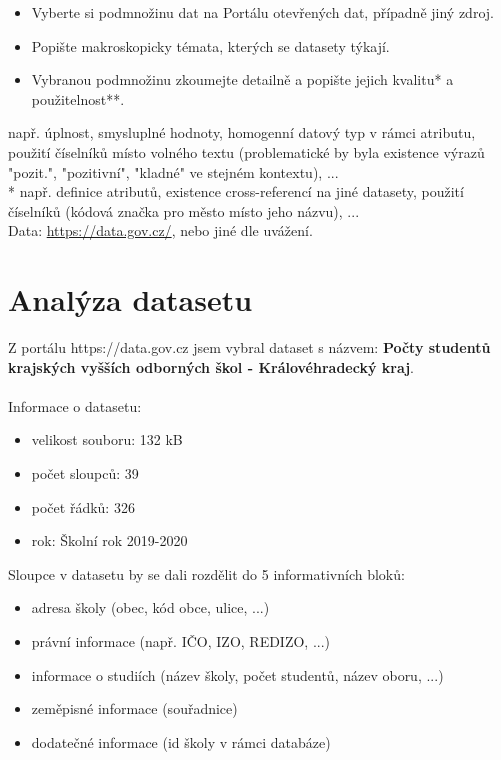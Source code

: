 \documentclass[12pt, a4paper]{article}
\begin{document}
\begin{itemize}
\item Vyberte si podmnožinu dat na Portálu otevřených dat, případně jiný zdroj. \\
\item Popište makroskopicky témata, kterých se datasety týkají.\\
\item Vybranou podmnožinu zkoumejte detailně a popište jejich kvalitu* a použitelnost**.\\
\end{itemize}

\noindent * např. úplnost, smysluplné hodnoty, homogenní datový typ v rámci atributu, použití číselníků místo volného textu (problematické by byla existence výrazů "pozit.", "pozitivní", "kladné" ve stejném kontextu), ...\\

\noindent ** např. definice atributů, existence cross-referencí na jiné datasety, použití číselníků (kódová značka pro město místo jeho názvu), ...\\

\noindent Data: \href{https://data.gov.cz/}{https://data.gov.cz/}, nebo jiné dle uvážení.\\
 \newpage

\section{Analýza datasetu}
Z portálu https://data.gov.cz jsem vybral dataset s názvem: \textbf{Počty studentů krajských vyšších odborných škol - Královéhradecký kraj}.\\\\
\noindent Informace o datasetu:
\begin{itemize}
\item velikost souboru: 132 kB 
\item počet sloupců: 39 
\item počet řádků: 326 
\item rok: Školní rok 2019-2020 \\
\end{itemize}

\noindent Sloupce v datasetu by se dali rozdělit do 5 informativních bloků:
\begin{itemize}
\item adresa školy (obec, kód obce, ulice, ...)
\item právní informace (např. IČO, IZO, REDIZO, ...) 
\item informace o studiích (název školy, počet studentů, název oboru, ...) 
\item zeměpisné informace (souřadnice)
\item dodatečné informace (id školy v rámci databáze)\\
\end{itemize}
\end{document}
